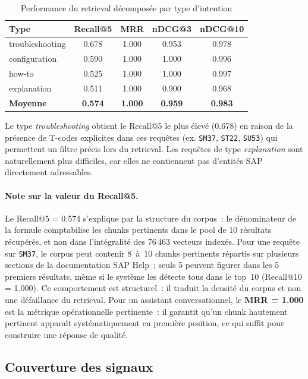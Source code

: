 \begin{table}[H]
\centering
\caption{Performance du retrieval décomposée par type d'intention}
\label{tab:retrieval-by-type}
\begin{tabular}{|l|c|c|c|c|}
\hline
\textbf{Type} & \textbf{Recall@5} & \textbf{MRR} & \textbf{nDCG@3} & \textbf{nDCG@10} \\
\hline
troubleshooting & 0.678 & 1.000 & 0.953 & 0.978 \\
\hline
configuration   & 0.590 & 1.000 & 1.000 & 0.996 \\
\hline
how-to          & 0.525 & 1.000 & 1.000 & 0.997 \\
\hline
explanation     & 0.511 & 1.000 & 0.900 & 0.968 \\
\hline
\textbf{Moyenne} & \textbf{0.574} & \textbf{1.000} & \textbf{0.959} & \textbf{0.983} \\
\hline
\end{tabular}
\end{table}

Le type \textit{troubleshooting} obtient le Recall@5 le plus élevé (0.678) en raison de la présence de T-codes explicites dans ces requêtes (ex. \texttt{SM37}, \texttt{ST22}, \texttt{SU53}) qui permettent un filtre précis lors du retrieval. Les requêtes de type \textit{explanation} sont naturellement plus difficiles, car elles ne contiennent pas d'entités SAP directement adressables.

\paragraph{Note sur la valeur du Recall@5.}
Le Recall@5 = 0.574 s'explique par la structure du corpus~: le dénominateur de la formule comptabilise les chunks pertinents dans le pool de 10 résultats récupérés, et non dans l'intégralité des 76\,463 vecteurs indexés. Pour une requête sur \texttt{SM37}, le corpus peut contenir 8~à~10 chunks pertinents répartis sur plusieurs sections de la documentation SAP Help~; seuls 5 peuvent figurer dans les 5 premiers résultats, même si le système les détecte tous dans le top~10 (Recall@10 = 1.000). Ce comportement est structurel~: il traduit la densité du corpus et non une défaillance du retrieval. Pour un assistant conversationnel, le \textbf{MRR = 1.000} est la métrique opérationnelle pertinente~: il garantit qu'un chunk hautement pertinent apparaît systématiquement en première position, ce qui suffit pour construire une réponse de qualité.

\subsection{Couverture des signaux}

